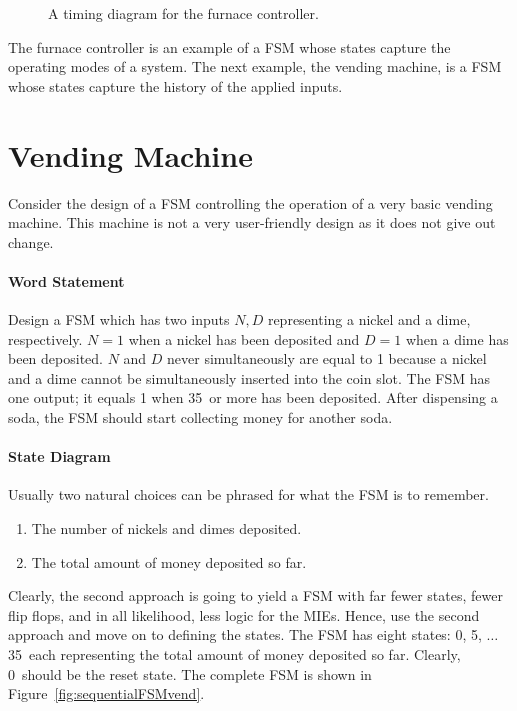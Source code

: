 \begin{figure}[ht]

    \caption{A timing diagram for the furnace controller.}
    \label{fig:sequentialFSMFurnaceTime}

\end{figure}

The furnace controller is an example of a FSM whose states capture
the operating modes of a system.  The next example, the vending
machine, is a FSM whose states capture the history of the applied
inputs.


\section{Vending Machine}
Consider the design of a FSM controlling the operation of a
very basic vending machine.  This machine is not a very user-friendly design
as it does not give out change.

\paragraph{Word Statement}
Design a FSM which has two inputs $N, D$ representing a nickel and a dime,
respectively.  $N=1$ when a nickel has been deposited and $D=1$
when a dime has been deposited. $N$ and $D$ never simultaneously are
equal to 1 because a nickel and a dime cannot be simultaneously
inserted into the coin slot.  The FSM has one output; it equals 1
when 35\textcent~or more has been deposited.  After dispensing a
soda, the FSM should start collecting money for another soda.

\paragraph{State Diagram}
Usually two natural choices can be phrased for what the
FSM is to remember.
\begin{enumerate}
    \item The number of nickels and dimes deposited.
    \item The total amount of money deposited so far.
\end{enumerate}

Clearly, the second approach is going to yield a FSM with far fewer
states, fewer flip flops, and in all likelihood, less logic for the
MIEs.  Hence, use the second approach and move on to
defining the states.  The FSM has eight states:
0\textcent, 5\textcent, $\ldots$ 35\textcent~each representing the total
amount of money deposited so far.  Clearly, 0\textcent~should be the
reset state.  The complete FSM is shown in Figure~\ref{fig:sequentialFSMvend}.

